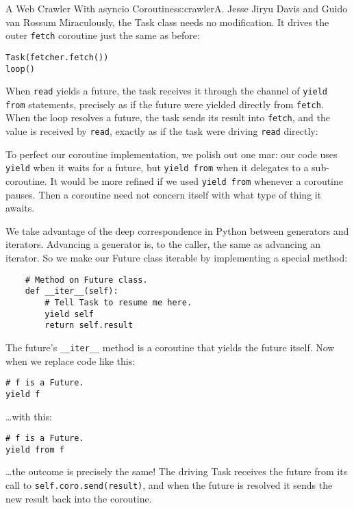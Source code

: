 \begin{aosachapter}{A Web Crawler With asyncio Coroutines}{s:crawler}{A. Jesse Jiryu Davis and Guido van Rossum}
Miraculously, the Task class needs no modification. It drives the outer
\texttt{fetch} coroutine just the same as before:

\begin{verbatim}
Task(fetcher.fetch())
loop()
\end{verbatim}

When \texttt{read} yields a future, the task receives it through the
channel of \texttt{yield from} statements, precisely as if the future
were yielded directly from \texttt{fetch}. When the loop resolves a
future, the task sends its result into \texttt{fetch}, and the value is
received by \texttt{read}, exactly as if the task were driving
\texttt{read} directly:


To perfect our coroutine implementation, we polish out one mar: our code
uses \texttt{yield} when it waits for a future, but \texttt{yield from}
when it delegates to a sub-coroutine. It would be more refined if we
used \texttt{yield from} whenever a coroutine pauses. Then a coroutine
need not concern itself with what type of thing it awaits.

We take advantage of the deep correspondence in Python between
generators and iterators. Advancing a generator is, to the caller, the
same as advancing an iterator. So we make our Future class iterable by
implementing a special method:

\begin{verbatim}
    # Method on Future class.
    def __iter__(self):
        # Tell Task to resume me here.
        yield self
        return self.result
\end{verbatim}

The future's \texttt{\_\_iter\_\_} method is a coroutine that yields the
future itself. Now when we replace code like this:

\begin{verbatim}
# f is a Future.
yield f
\end{verbatim}

\ldots{}with this:

\begin{verbatim}
# f is a Future.
yield from f
\end{verbatim}

\ldots{}the outcome is precisely the same! The driving Task receives the
future from its call to \texttt{self.coro.send(result)}, and when the
future is resolved it sends the new result back into the coroutine.


\end{aosachapter}
